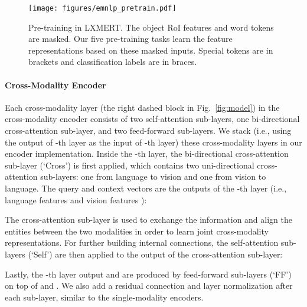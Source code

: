 \documentclass[11pt,a4paper]{article}
\begin{document}
\begin{figure*}[t]
\centering
\texttt{[image: figures/emnlp\_pretrain.pdf]}
\caption{
Pre-training in LXMERT. The object RoI features and word tokens are masked.
Our five pre-training tasks learn the feature representations based on these masked inputs.
Special tokens are in brackets and classification labels are in braces. 
}
\label{fig:pretrain}
\vspace{-8pt}
\end{figure*}

\paragraph{Cross-Modality Encoder}
\label{sec:crossatt}
Each cross-modality layer (the right dashed block in Fig.~\ref{fig:model}) in the cross-modality encoder consists of two self-attention sub-layers, one bi-directional cross-attention sub-layer, and two feed-forward sub-layers. 
We stack (i.e., using the output of -th layer as the input of -th layer)  these cross-modality layers in our encoder implementation.
Inside the -th layer, the bi-directional cross-attention sub-layer (`Cross') is first applied, which contains two uni-directional cross-attention sub-layers: one from language to vision and one from vision to language.
The query and context vectors are the outputs of the -th layer (i.e., language features  and vision features ):

The cross-attention sub-layer is used to exchange the information and align the entities between the two modalities in order to learn joint cross-modality representations.
For further building internal connections, the self-attention sub-layers (`Self') are then applied to the output of the cross-attention sub-layer:

Lastly, the -th layer output  and  are produced by feed-forward sub-layers (`FF') on top of  and .
We also add a residual connection and layer normalization after each sub-layer, similar to the single-modality encoders.
\end{document}
